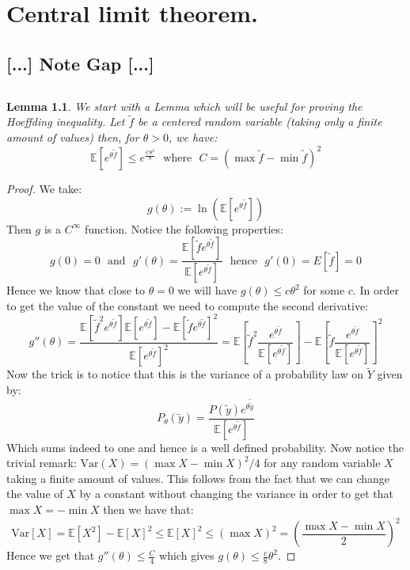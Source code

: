 \documentclass[10pt,a4paper]{book}
\newtheorem{lemma}[theorem]{Lemma}
\theoremstyle{definition}
\begin{document}
\chapter{Central limit theorem.}

\section{[...] Note Gap [...]}

\section{}

\begin{lemma}
We start with a Lemma which will be useful for proving the Hoeffding inequality. Let $\tilde{f}$ be a centered random variable (taking only a finite amount of values) then, for $\theta > 0$, we have:
\[
\mathbb{E}[e^{\theta \tilde{f}}] \leq e^{\frac{C \theta^2}{8}} \mbox{~~where~~} C = (\max \tilde{f} - \min \tilde{f})^2
\]
\end{lemma}

\begin{proof}
We take:
\[
g(\theta) := \ln(\mathbb{E}[e^{\theta \tilde{f}}])
\]
Then $g$ is a $C^\infty$ function. Notice the following properties:
\[
g(0) = 0 \mbox{~~and~~} g'(\theta) = \frac{\mathbb{E}[\tilde{f} e^{\theta \tilde{f}}]}{\mathbb{E}[e^{\theta \tilde{f}}]} \mbox{~~hence~~} g'(0) = E[\tilde{f}] = 0
\]
Hence we know that close to $\theta = 0$ we will have $g(\theta) \leq c \theta^2$ for some $c$. In order to get the value of the constant we need to compute the second derivative:
\[
g''(\theta) = \frac{\mathbb{E}[\tilde{f}^2 e^{\theta \tilde{f}}] \mathbb{E}[e^{\theta \tilde{f}}] - \mathbb{E}[\tilde{f} e^{\theta \tilde{f}}]^2}{\mathbb{E}[e^{\theta \tilde{f}}]^2} = \mathbb{E}\left[ \tilde{f}^2 \frac{e^{\theta \tilde{f}}}{\mathbb{E}[e^{\theta \tilde{f}}]} \right] - \mathbb{E}\left[ \tilde{f} \frac{e^{\theta \tilde{f}}}{\mathbb{E}[e^{\theta \tilde{f}}]} \right]^2
\]
Now the trick is to notice that this is the variance of a probability law on $\tilde{Y}$ given by:
\[
P_\theta(\tilde{y}) = \frac{P(\tilde{y}) e^{\theta \tilde{\tilde{y}}}}{\mathbb{E}[e^{\theta \tilde{f}}]}
\]
Which sums indeed to one and hence is a well defined probability. Now notice the trivial remark: $\text{Var}(X) = (\max X - \min X)^2/4$ for any random variable $X$ taking a finite amount of values. This follows from the fact that we can change the value of $X$ by a constant without changing the variance in order to get that $\max X = -\min X$ then we have that:
\[
\text{Var}[X] = \mathbb{E}[X^2] - \mathbb{E}[X]^2 \leq \mathbb{E}[X]^2 \leq (\max X)^2 = \left(\frac{\max X - \min X}{2}\right)^2
\]
Hence we get that $g''(\theta) \leq \frac{C}{4}$ which gives $g(\theta) \leq \frac{c}{8}\theta^2$. 
\end{proof}
\end{document}
